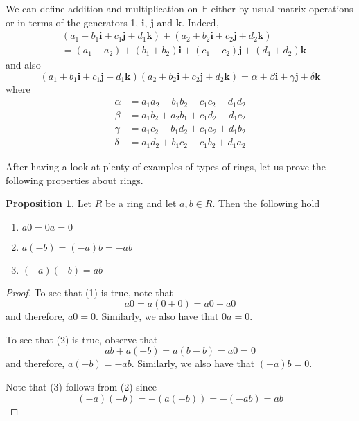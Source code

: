 \documentclass[11pt]{book}
\theoremstyle{definition}\newtheorem{definition}[subsection]{Definition}
\theoremstyle{definition}\newtheorem{example}[subsection]{Example}
\theoremstyle{definition}\newtheorem{notation}[subsection]{Notation}
\theoremstyle{definition}\newtheorem{remark}[subsection]{Remark}
\theoremstyle{theorem}\newtheorem{theorem}[subsection]{Theorem}
\theoremstyle{theorem}\newtheorem{lemma}[subsection]{Lemma}
\theoremstyle{theorem}\newtheorem{proposition}[subsection]{Proposition}
\theoremstyle{theorem}\newtheorem{corollary}[subsection]{Corollary}
\renewcommand{\H}{\mathbb{H}}
\begin{document}
We can define addition and multiplication on $\H$ either by usual matrix operations or in terms of the generators 1, $\mathbf{i}$, $\mathbf{j}$ and $\mathbf{k}$. Indeed,
\begin{align*}
    &(a_1 + b_1\mathbf{i} + c_1\mathbf{j} + d_1\mathbf{k}) + (a_2 + b_2\mathbf{i} + c_2\mathbf{j} + d_2\mathbf{k}) \\
    &= (a_1 + a_2) + (b_1 + b_2)\mathbf{i} + (c_1 + c_2)\mathbf{j} + (d_1 + d_2)\mathbf{k}
\end{align*}
and also
\begin{equation*}
    (a_1 + b_1\mathbf{i} + c_1\mathbf{j} + d_1\mathbf{k})(a_2 + b_2\mathbf{i} + c_2\mathbf{j} + d_2\mathbf{k}) = \alpha + \beta\mathbf{i} + \gamma\mathbf{j} + \delta\mathbf{k}
\end{equation*}
where
\begin{align*}
    \alpha &= a_1a_2 - b_1b_2 - c_1c_2 - d_1d_2 \\
    \beta &= a_1b_2 + a_2b_1 + c_1d_2 - d_1c_2 \\
    \gamma &= a_1c_2 - b_1d_2 + c_1a_2 + d_1b_2 \\
    \delta &= a_1d_2 + b_1c_2 - c_1b_2 + d_1a_2
\end{align*}

After having a look at plenty of examples of types of rings, let us prove the following properties about rings.

\begin{proposition}\label{proposition:1.1.20}
    Let $R$ be a ring and let $a, b \in R$. Then the following hold
    \begin{enumerate}
        \item $a0 = 0a = 0$
        \item $a(-b) = (-a)b = -ab$
        \item $(-a)(-b) = ab$
    \end{enumerate}
\end{proposition}

\begin{proof}
    To see that (1) is true, note that
    \begin{equation*}
        a0 = a(0 + 0) = a0 + a0
    \end{equation*}
    and therefore, $a0 = 0$. Similarly, we also have that $0a = 0$.

    To see that (2) is true, observe that
    \begin{equation*}
        ab + a(-b) = a(b - b) = a0 = 0
    \end{equation*}
    and therefore, $a(-b) = -ab$. Similarly, we also have that $(-a)b = 0$.

    Note that (3) follows from (2) since
    \begin{equation*}
        (-a)(-b) = -(a(-b)) = -(-ab) = ab
    \end{equation*}
\end{proof}
\end{document}
